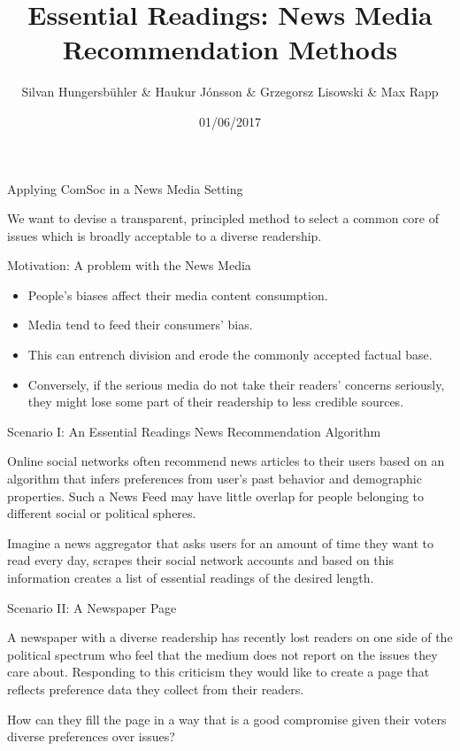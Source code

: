 \documentclass{beamer}
\title{Essential Readings: News Media Recommendation Methods}
\author{Silvan Hungersb\"{u}hler \& Haukur J\'{o}nsson \& Grzegorsz Lisowski \& Max Rapp}
\date{01/06/2017}
\begin{document}
	
\begin{frame}
	\titlepage
\end{frame}

\begin{frame}{Applying ComSoc in a News Media Setting}

We want to devise a transparent, principled method to select a common core of issues which is broadly acceptable to a diverse readership.

\end{frame}

\begin{frame}{Motivation: A problem with the News Media}

\begin{itemize}
\item People's biases affect their media content consumption.
\item Media tend to feed their consumers' bias.
\item This can entrench division and erode the commonly accepted factual base.
\item Conversely, if the serious media do not take their readers' concerns seriously, they might lose some part of their readership to less credible sources.

\end{itemize}
	
\end{frame}

\begin{frame}{Scenario I: An Essential Readings News Recommendation Algorithm}
	
	Online social networks often recommend news articles to their users based on an algorithm that infers preferences from user's past behavior and demographic properties. Such a News Feed may have little overlap for people belonging to different social or political spheres.

	\vspace{5mm}

	Imagine a news aggregator that asks users for an amount of time they want to read every day, scrapes their social network accounts and based on this information creates a list of essential readings of the desired length.
		
\end{frame}

\begin{frame}{Scenario II: A  Newspaper Page}
	
	A newspaper with a diverse readership has recently lost readers on one side of the political spectrum who feel that the medium does not report on the issues they care about. Responding to this criticism they would like to create a page that reflects preference data they collect from their readers.

	\vspace{5mm}

	How can they fill the page in a way that is a good compromise given their voters diverse preferences over issues?
	
\end{frame}
\end{document}
